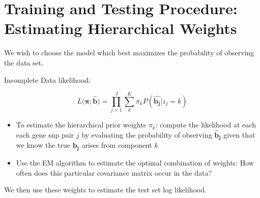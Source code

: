 \documentclass[10pt,letterpaper]{article}
\begin{document}
\section{Training and Testing Procedure: Estimating Hierarchical Weights}

We wish to choose the model which best maximizes the probability of observing the data set. 

Incomplete Data likelihood:

\begin{equation}
L(\bm\pi;{\hat{\bm{b}})} = \prod_{j=1}^J \sum_{k}^{K} \pi_{k} P(\hat{\bm{b_{j}}} | z_{j}=k)
\end{equation}

\begin{itemize}
\item  To estimate the hierarchical prior weights $\pi_{k}$: compute the likelihood at each each gene snp pair $j$ by evaluating the probability of observing $\bm{\hat{b}_{j}}$ given that we know the true $\bm{b_{j}}$ arises from component $k$
\item  Use the EM algorithm to estimate the optimal combination of weights: How often does this particular covariance matrix occur in the data?
\end{itemize}

We then use these weights to estimate the test set log likelihood.

\end{document}
